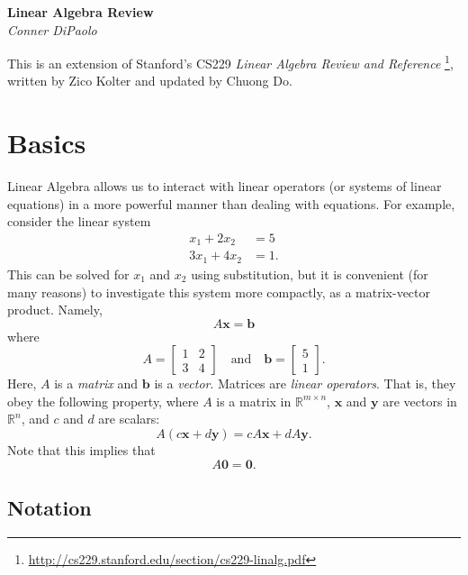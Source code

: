 \documentclass{article}
\newcommand{\1}{\mathbf{1}}
\newcommand{\0}{\mathbf{0}}
\newcommand{\xx}{\mathbf{x}}
\newcommand{\yy}{\mathbf{y}}
\newcommand{\bb}{\mathbf{b}}
\newcommand{\RR}{\mathbb{R}}
\newcommand{\m}[1]{\begin{bmatrix} #1 \end{bmatrix}}
\begin{document}
\begin{center}
  \Large\textbf{Linear Algebra Review}\\
  \large\textit{Conner DiPaolo}
\end{center}
\vspace*{1em}

\tableofcontents
\vspace{1em}

This is an extension of Stanford's CS229 \textit{Linear Algebra Review and Reference}
\footnote{\url{http://cs229.stanford.edu/section/cs229-linalg.pdf}}, written by Zico Kolter
and updated by Chuong Do.

\section{Basics}

Linear Algebra allows us to interact with linear operators (or systems
of linear equations) in a more powerful manner than dealing with equations.
For example, consider the linear system
\begin{align*}
    x_1 + 2x_2 &= 5\\
    3x_1 + 4x_2 &= 1.
\end{align*}
This can be solved for $x_1$ and $x_2$ using substitution, but it is
convenient (for many reasons) to investigate this system more compactly,
as a matrix-vector product. Namely,
\[
    A\xx = \bb
\]
where
\[
    A = \m{1&2\\3&4} \quad\text{and}\quad \bb = \m{5\\1}.
\]
Here, $A$ is a \textit{matrix} and $\bb$ is a \textit{vector}. Matrices are
\textit{linear operators}. That is, they obey the following property, where
$A$ is a matrix in $\RR^{m\times n}$, $\xx$ and $\yy$ are vectors in $\RR^n$,
and $c$ and $d$ are scalars:
\[
    A(c\xx+d\yy) = cA\xx + dA\yy.
\]
Note that this implies that
\[
    A\0 = \0.
\]

\subsection{Notation}
\end{document}
